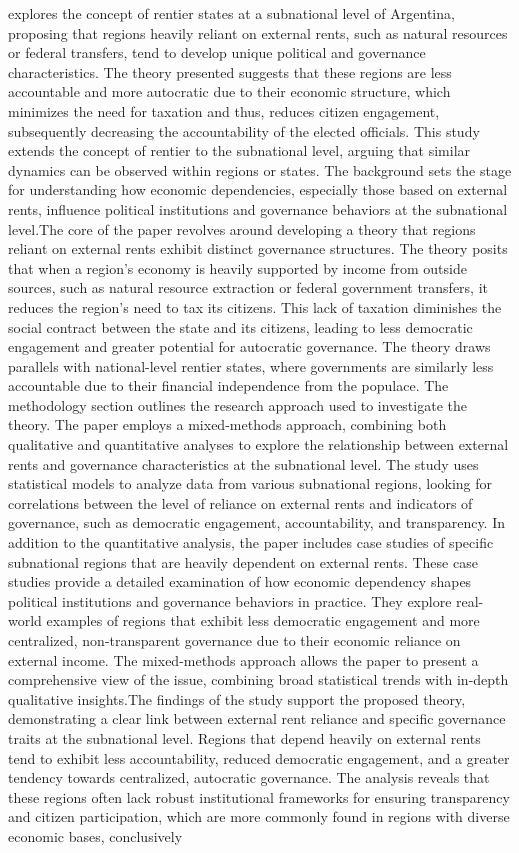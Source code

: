   explores the concept of rentier states at a subnational level of Argentina, proposing that regions heavily reliant on external rents, such as natural resources or federal transfers, tend to develop unique political and governance characteristics. The theory presented suggests that these regions are less accountable and more autocratic due to their economic structure, which minimizes the need for taxation and thus, reduces citizen engagement, subsequently decreasing the accountability of the elected officials. This study extends the concept of rentier to the subnational level, arguing that similar dynamics can be observed within regions or states. The background sets the stage for understanding how economic dependencies, especially those based on external rents, influence political institutions and governance behaviors at the subnational level.The core of the paper revolves around developing a theory that regions reliant on external rents exhibit distinct governance structures. The theory posits that when a region’s economy is heavily supported by income from outside sources, such as natural resource extraction or federal government transfers, it reduces the region's need to tax its citizens. This lack of taxation diminishes the social contract between the state and its citizens, leading to less democratic engagement and greater potential for autocratic governance. The theory draws parallels with national-level rentier states, where governments are similarly less accountable due to their financial independence from the populace. The methodology section outlines the research approach used to investigate the theory. The paper employs a mixed-methods approach, combining both qualitative and quantitative analyses to explore the relationship between external rents and governance characteristics at the subnational level. The study uses statistical models to analyze data from various subnational regions, looking for correlations between the level of reliance on external rents and indicators of governance, such as democratic engagement, accountability, and transparency. In addition to the quantitative analysis, the paper includes case studies of specific subnational regions that are heavily dependent on external rents. These case studies provide a detailed examination of how economic dependency shapes political institutions and governance behaviors in practice. They explore real-world examples of regions that exhibit less democratic engagement and more centralized, non-transparent governance due to their economic reliance on external income. The mixed-methods approach allows the paper to present a comprehensive view of the issue, combining broad statistical trends with in-depth qualitative insights.The findings of the study support the proposed theory, demonstrating a clear link between external rent reliance and specific governance traits at the subnational level. Regions that depend heavily on external rents tend to exhibit less accountability, reduced democratic engagement, and a greater tendency towards centralized, autocratic governance. The analysis reveals that these regions often lack robust institutional frameworks for ensuring transparency and citizen participation, which are more commonly found in regions with diverse economic bases, conclusively 